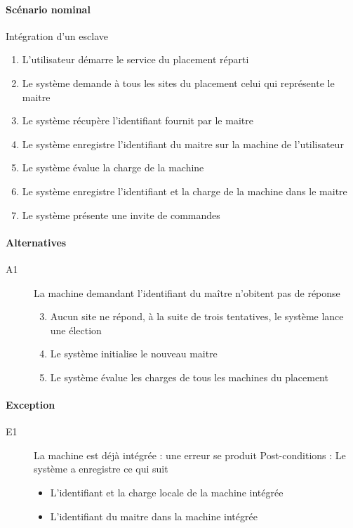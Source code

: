     \paragraph{Scénario nominal} Intégration d'un esclave

      \begin{enumerate}
        \item L'utilisateur démarre le service du placement réparti
        \item Le système demande à tous les sites du placement celui qui représente le maitre
        \item Le système récupère l'identifiant fournit par le maitre
        \item Le système enregistre l'identifiant du maitre sur la machine de l'utilisateur
        \item Le système évalue la charge de la machine
        \item Le système enregistre l'identifiant et la charge de la machine dans le maitre
        \item Le système présente une invite de commandes
      \end{enumerate}

    \paragraph{Alternatives}
      \begin{description}
        \item[A1] La machine demandant l'identifiant du maître
          n'obitent pas de réponse
        \begin{enumerate}
          \setcounter{enumi}{2}
          \item Aucun site ne répond, à la suite de trois tentatives,
            le système lance une élection
          \item Le système initialise le nouveau maitre
          \item Le système évalue les charges de tous les machines du
            placement
        \end{enumerate}
      \end{description}

    \paragraph{Exception}
      \begin{description}
        \item[E1] La machine est déjà intégrée : une erreur se produit
          Post-conditions : Le système a enregistre ce qui suit
        \begin{itemize}
          \item L'identifiant et la charge locale de la machine
            intégrée 
          \item L'identifiant du maitre dans la machine intégrée
        \end{itemize}
      \end{description}

